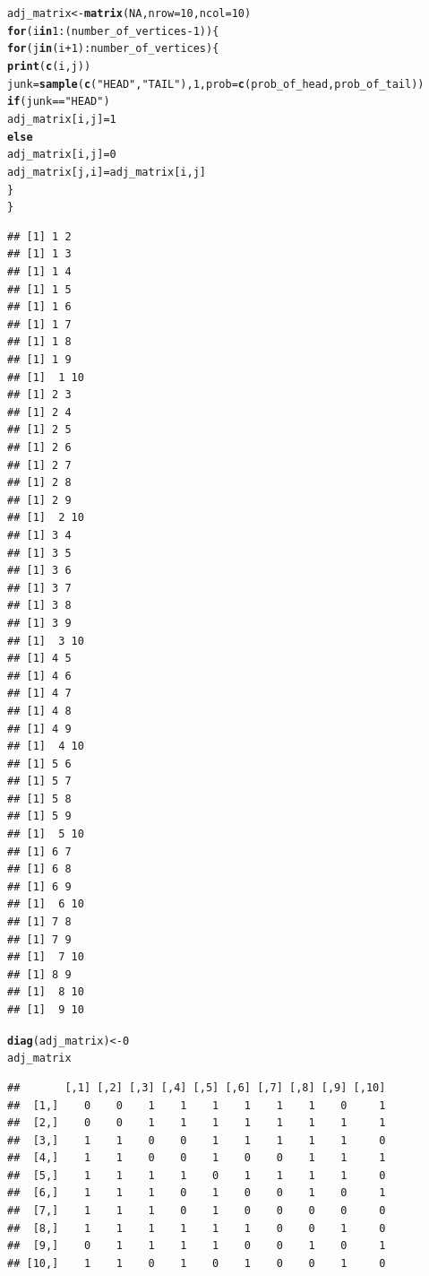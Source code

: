 \documentclass[11pt]{article}\usepackage[]{graphicx}\usepackage[dvipsnames]{xcolor}
\makeatletter
\newcommand{\hlnum}[1]{\textcolor[rgb]{0.686,0.059,0.569}{#1}}%
\newcommand{\hlsng}[1]{\textcolor[rgb]{0.192,0.494,0.8}{#1}}%
\newcommand{\hlopt}[1]{\textcolor[rgb]{0,0,0}{#1}}%
\newcommand{\hldef}[1]{\textcolor[rgb]{0.345,0.345,0.345}{#1}}%
\newcommand{\hlkwa}[1]{\textcolor[rgb]{0.161,0.373,0.58}{\textbf{#1}}}%
\newcommand{\hlkwb}[1]{\textcolor[rgb]{0.69,0.353,0.396}{#1}}%
\newcommand{\hlkwc}[1]{\textcolor[rgb]{0.333,0.667,0.333}{#1}}%
\newcommand{\hlkwd}[1]{\textcolor[rgb]{0.737,0.353,0.396}{\textbf{#1}}}%
\newenvironment{kframe}{%
 \def\at@end@of@kframe{}%
 \ifinner\ifhmode%
  \def\at@end@of@kframe{\end{minipage}}%
  \begin{minipage}{\columnwidth}%
 \fi\fi%
 \def\FrameCommand##1{\hskip\@totalleftmargin \hskip-\fboxsep
 \colorbox{shadecolor}{##1}\hskip-\fboxsep
     \hskip-\linewidth \hskip-\@totalleftmargin \hskip\columnwidth}%
 \MakeFramed {\advance\hsize-\width
   \@totalleftmargin\z@ \linewidth\hsize
   \@setminipage}}%
 {\par\unskip\endMakeFramed%
 \at@end@of@kframe}
\newenvironment{knitrout}{}{} %
\theoremstyle{problemstyle}
\makeatother
\begin{document}
\begin{enumerate}[label=\arabic*.]
\begin{enumerate}[label=(\alph*)]
\begin{knitrout}
\begin{kframe}
\begin{alltt}
    \hldef{adj_matrix} \hlkwb{<-} \hlkwd{matrix}\hldef{(}\hlnum{NA}\hldef{,} \hlkwc{nrow}\hldef{=}\hlnum{10}\hldef{,} \hlkwc{ncol}\hldef{=}\hlnum{10}\hldef{)}
\hlkwa{for}\hldef{(i} \hlkwa{in} \hlnum{1}\hlopt{:}\hldef{(number_of_vertices}\hlopt{-}\hlnum{1}\hldef{))\{}
  \hlkwa{for}\hldef{(j} \hlkwa{in} \hldef{(i}\hlopt{+}\hlnum{1}\hldef{)}\hlopt{:}\hldef{number_of_vertices) \{}
    \hlkwd{print}\hldef{(}\hlkwd{c}\hldef{(i,j))}
    \hldef{junk} \hlkwb{=} \hlkwd{sample}\hldef{(}\hlkwd{c}\hldef{(}\hlsng{"HEAD"}\hldef{,}\hlsng{"TAIL"}\hldef{),} \hlnum{1}\hldef{,} \hlkwc{prob} \hldef{=} \hlkwd{c}\hldef{(prob_of_head,prob_of_tail))}
    \hlkwa{if}\hldef{(junk}\hlopt{==}\hlsng{"HEAD"}\hldef{)}
    \hldef{adj_matrix[i,j]} \hlkwb{=} \hlnum{1}
    \hlkwa{else}
      \hldef{adj_matrix[i,j]}\hlkwb{=} \hlnum{0}
    \hldef{adj_matrix[j,i]} \hlkwb{=} \hldef{adj_matrix[i,j]}
  \hldef{\}}
\hldef{\}}
\end{alltt}
\begin{verbatim}
## [1] 1 2
## [1] 1 3
## [1] 1 4
## [1] 1 5
## [1] 1 6
## [1] 1 7
## [1] 1 8
## [1] 1 9
## [1]  1 10
## [1] 2 3
## [1] 2 4
## [1] 2 5
## [1] 2 6
## [1] 2 7
## [1] 2 8
## [1] 2 9
## [1]  2 10
## [1] 3 4
## [1] 3 5
## [1] 3 6
## [1] 3 7
## [1] 3 8
## [1] 3 9
## [1]  3 10
## [1] 4 5
## [1] 4 6
## [1] 4 7
## [1] 4 8
## [1] 4 9
## [1]  4 10
## [1] 5 6
## [1] 5 7
## [1] 5 8
## [1] 5 9
## [1]  5 10
## [1] 6 7
## [1] 6 8
## [1] 6 9
## [1]  6 10
## [1] 7 8
## [1] 7 9
## [1]  7 10
## [1] 8 9
## [1]  8 10
## [1]  9 10
\end{verbatim}
\begin{alltt}
\hlkwd{diag}\hldef{(adj_matrix)} \hlkwb{<-} \hlnum{0}
\hldef{adj_matrix}
\end{alltt}
\begin{verbatim}
##       [,1] [,2] [,3] [,4] [,5] [,6] [,7] [,8] [,9] [,10]
##  [1,]    0    0    1    1    1    1    1    1    0     1
##  [2,]    0    0    1    1    1    1    1    1    1     1
##  [3,]    1    1    0    0    1    1    1    1    1     0
##  [4,]    1    1    0    0    1    0    0    1    1     1
##  [5,]    1    1    1    1    0    1    1    1    1     0
##  [6,]    1    1    1    0    1    0    0    1    0     1
##  [7,]    1    1    1    0    1    0    0    0    0     0
##  [8,]    1    1    1    1    1    1    0    0    1     0
##  [9,]    0    1    1    1    1    0    0    1    0     1
## [10,]    1    1    0    1    0    1    0    0    1     0
\end{verbatim}
\end{kframe}
\end{knitrout}

\end{enumerate}
\end{enumerate}
\end{document}
